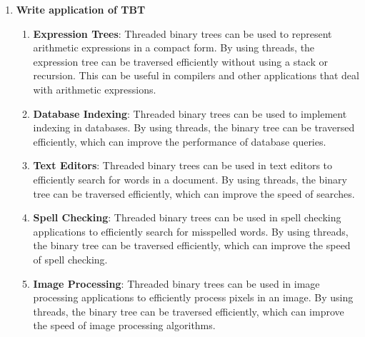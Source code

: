 \documentclass[11pt]{article}
\begin{document}
\begin{enumerate}
    \item \textbf{Write application of TBT}\\

          \begin{enumerate}
              \item \textbf{Expression Trees}: Threaded binary trees can be used to represent arithmetic expressions in a compact form. By using threads, the expression tree can be traversed efficiently without using a stack or recursion. This can be useful in compilers and other applications that deal with arithmetic expressions.

              \item \textbf{Database Indexing}: Threaded binary trees can be used to implement indexing in databases. By using threads, the binary tree can be traversed efficiently, which can improve the performance of database queries.

              \item \textbf{Text Editors}: Threaded binary trees can be used in text editors to efficiently search for words in a document. By using threads, the binary tree can be traversed efficiently, which can improve the speed of searches.

              \item \textbf{Spell Checking}: Threaded binary trees can be used in spell checking applications to efficiently search for misspelled words. By using threads, the binary tree can be traversed efficiently, which can improve the speed of spell checking.

              \item \textbf{Image Processing}: Threaded binary trees can be used in image processing applications to efficiently process pixels in an image. By using threads, the binary tree can be traversed efficiently, which can improve the speed of image processing algorithms.


          \end{enumerate}

\end{enumerate}
\end{document}
